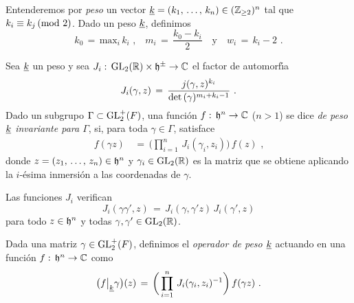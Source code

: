 Entenderemos por \emph{peso} un vector
\begin{math}
	\peso{k}=(\lista{k}{n})\in(\bb{Z}_{\geq 2})^{n}
\end{math}
tal que $k_{i}\equiv k_{j}\,(\mathrm{mod}\,\,2)$. Dado un peso $\underline{k}$, definimos
\begin{equation}
	\label{eq:pesomatrices}
	k_{0} \,=\,\mathrm{max}_{i}\,k_{i} \text{ ,}\quad
		m_{i} \,=\,\frac{k_{0} - k_{i}}{2}\quad\text{y}\quad
		w_{i} \,=\,k_{i}-2
	\text{ .}
\end{equation}
%

\begin{defPesoKInvariante}\label{def:pesokinvariante}
	Sea $\underline{k}$ un peso y sea
	\begin{math}
		J_{i}:\,\mathrm{GL}_{2}(\mathbb{R})\times\mathfrak{h}^{\pm}\rightarrow\mathbb{C}
	\end{math}
	el factor de automorf\'{\i}a
	\begin{equation}
		\label{eq:factordeautomorfiamatrices}
		J_{i}(\gamma,z) \,=\, \frac{j(\gamma,z)^{k_{i}}}{%
			\det(\gamma)^{m_{i}+k_{i}-1}}
		\text{ .}
	\end{equation}
	Dado un subgrupo $\Gamma\subset\mathrm{GL}^{+}_{2}(F)$, una funci\'{o}n
	$f:\,\mathfrak{h}^{n}\rightarrow\mathbb{C}$ ($n>1$) se dice \emph{de peso %
	$\underline{k}$ invariante para $\Gamma$}, si, para toda $\gamma\in\Gamma$,
	satisface
	\begin{align*}
		f(\gamma z) & \,=\,\bigg(
			\prod_{i=1}^{n}\,J_{i}(\gamma_{i},z_{i})\bigg)\,f(z)
		\text{ ,}
	\end{align*}
	donde $z=(\lista{z}{n})\in\hP^{n}$ y $\gamma_{i}\in\mathrm{GL}_{2}(\mathbb{R})$
	es la matriz que se obtiene aplicando la $i$-\'{e}sima inmersi\'{o}n
	a las coordenadas de $\gamma$.
\end{defPesoKInvariante}

Las funciones $J_{i}$ verifican
\begin{equation}
	\label{eq:factordeautomorfiacociclomatrices}
	J_i(\gamma\gamma',z) \,=\,J_i(\gamma,\gamma'z)\,J_i(\gamma',z)
\end{equation}
%
para todo $z\in\mathfrak{h}^{n}$ y todas $\gamma,\gamma'\in\mathrm{GL}_{2}(\mathbb{R})$.

\begin{defOperadorDePesoKMatrices}\label{def:operadordepesokmatrices}
	Dada una matriz $\gamma\in\mathrm{GL}^{+}_{2}(F)$, definimos el \emph{operador %
	de peso $\underline{k}$} actuando en una funci\'{o}n
	$f:\,\mathfrak{h}^{n}\rightarrow\mathbb{C}$ como
	\begin{equation}
		\label{eq:matricesoperadordepesok}
		\big(f\big|_{\underline{k}}{\gamma}\big) (z)\,=\,
			\bigg(\prod_{i=1}^{n}\,J_{i}(\gamma_{i},z_{i})^{-1}
			\bigg)\,f(\gamma z)
		\text{ .}
	\end{equation}
\end{defOperadorDePesoKMatrices}

